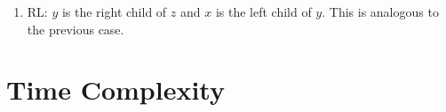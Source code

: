 \documentclass[12pt]{article}
\begin{document}
\begin{enumerate}
  \item RL: $y$ is the right child of $z$ and $x$ is the left child of $y$. This is analogous to the previous case.

\end{enumerate}

\section*{Time Complexity}
\end{document}
